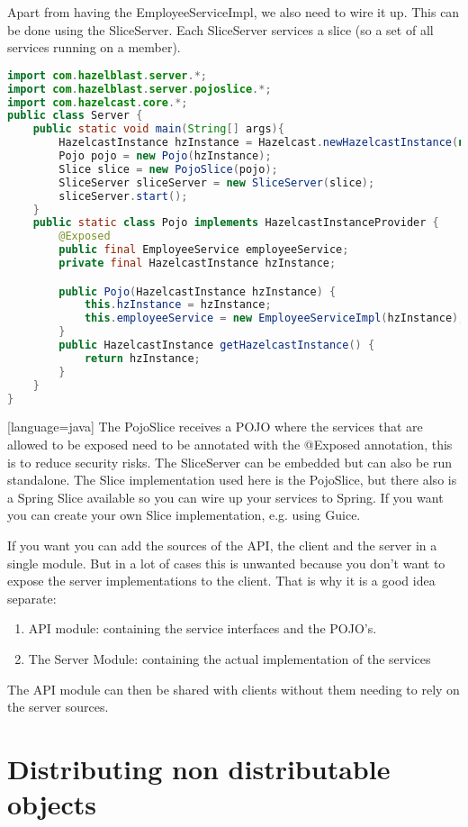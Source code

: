 Apart from having the EmployeeServiceImpl, we also need to wire it up. This can be done using the SliceServer. Each SliceServer services a slice (so a set of all services running on a member).
\begin{lstlisting}[language=java]
import com.hazelblast.server.*;
import com.hazelblast.server.pojoslice.*;
import com.hazelcast.core.*;
public class Server {
    public static void main(String[] args){
        HazelcastInstance hzInstance = Hazelcast.newHazelcastInstance(null);
        Pojo pojo = new Pojo(hzInstance);
        Slice slice = new PojoSlice(pojo);
        SliceServer sliceServer = new SliceServer(slice);
        sliceServer.start();
    }
    public static class Pojo implements HazelcastInstanceProvider {
        @Exposed
        public final EmployeeService employeeService;
        private final HazelcastInstance hzInstance;

        public Pojo(HazelcastInstance hzInstance) {
            this.hzInstance = hzInstance;
            this.employeeService = new EmployeeServiceImpl(hzInstance);
        }
        public HazelcastInstance getHazelcastInstance() {
            return hzInstance;
        }
    }
}
\end{lstlisting}[language=java]
The PojoSlice receives a POJO where the services that are allowed to be exposed need to be annotated with the @Exposed annotation, this is to reduce security risks. The SliceServer can be embedded but can also be run standalone. The Slice implementation used here is the PojoSlice, but there also is a Spring Slice available so you can wire up your services to Spring. If you want you can create your own Slice implementation, e.g. using Guice.

If you want you can add the sources of the API, the client and the server in a single module. But in a lot of cases this is unwanted because you don't want to expose the server implementations to the client. That is why it is a good idea separate:
\begin{enumerate}
\item API module: containing the service interfaces and the POJO's.
\item The Server Module: containing the actual implementation of the services
\end{enumerate}
The API module can then be shared with clients without them needing to rely on the server sources.

\section{Distributing non distributable objects}

